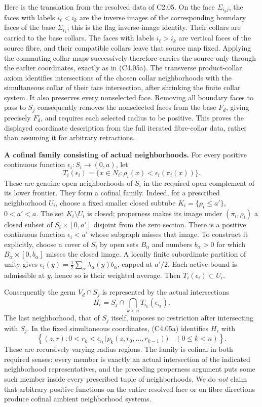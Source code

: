 Here is the translation from the resolved data of C2.05. On the face \(\Sigma_{i_kj}\), the faces with labels \(i_\ell<i_k\) are the inverse images of the corresponding boundary faces of the base \(\Sigma_{i_k}\); this is the flag inverse-image identity. Their collars are carried to the base collars. The faces with labels \(i_\ell>i_k\) are vertical faces of the source fibre, and their compatible collars leave that source map fixed. Applying the commuting collar maps successively therefore carries the source only through the earlier coordinates, exactly as in (C4.05a). The transverse product-collar axiom identifies intersections of the chosen collar neighborhoods with the simultaneous collar of their face intersection, after shrinking the finite collar system. It also preserves every nonselected face. Removing all boundary faces to pass to \(S_j\) consequently removes the nonselected faces from the base \(F_d\), giving precisely \(F_d^\circ\), and requires each selected radius to be positive. This proves the displayed coordinate description from the full iterated fibre-collar data, rather than assuming it for arbitrary retractions.

\textbf{A cofinal family consisting of actual neighborhoods.} For every positive continuous function \(\epsilon_i:S_i\to(0,a)\), let
\[
 T_i(\epsilon_i)=
 \{x\in N_i:\rho_i(x)<\epsilon_i(\pi_i(x))\}.
\]
These are genuine open neighborhoods of \(S_i\) in the required open complement of its lower frontier. They form a cofinal family. Indeed, for a prescribed neighborhood \(U_i\), choose a fixed smaller closed subtube \(K_i=\{\rho_i\le a'\}\), \(0<a'<a\). The set \(K_i\setminus U_i\) is closed; properness makes its image under \((\pi_i,\rho_i)\) a closed subset of \(S_i\times[0,a']\) disjoint from the zero section. There is a positive continuous function \(\epsilon_i<a'\) whose subgraph misses that image. To construct it explicitly, choose a cover of \(S_i\) by open sets \(B_\alpha\) and numbers \(b_\alpha>0\) for which \(B_\alpha\times[0,b_\alpha]\) misses the closed image. A locally finite subordinate partition of unity gives \(\epsilon_i(y)=\frac12\sum_\alpha\lambda_\alpha(y)b_\alpha\), capped at \(a'/2\). Each active bound is admissible at \(y\), hence so is their weighted average. Then \(T_i(\epsilon_i)\subset U_i\).

Consequently the germ \(V_d\cap S_j\) is represented by the actual intersections
\[
 H_\epsilon=S_j\cap\bigcap_{k<n}T_{i_k}(\epsilon_{i_k}).
\]
The last neighborhood, that of \(S_j\) itself, imposes no restriction after intersecting with \(S_j\). In the fixed simultaneous coordinates, (C4.05a) identifies \(H_\epsilon\) with
\[
 \left\{(z,r):
 0<r_k<\epsilon_{i_k}\bigl(p_k(z,r_0,\ldots,r_{k-1})\bigr)
 \quad(0\le k<n)\right\}.\tag{C4.05b}
\]
These are recursively varying radius regions. The family is cofinal in both required senses: every member is exactly an actual intersection of the indicated neighborhood representatives, and the preceding properness argument puts some such member inside every prescribed tuple of neighborhoods. We do \emph{not} claim that arbitrary positive functions on the entire resolved face or on fibre directions produce cofinal ambient neighborhood systems.


